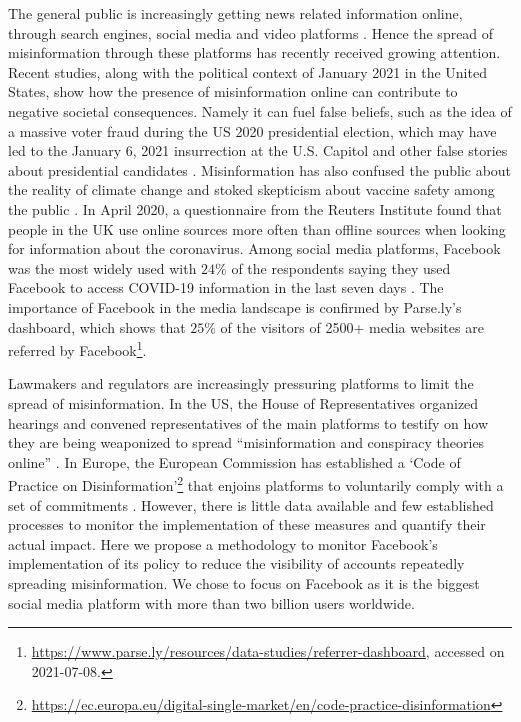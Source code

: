\documentclass[11pt,a4paper]{article}
\begin{document}
The general public is increasingly getting news related information online, through search engines, social media and video platforms \citep{mitchell2016modern}.
Hence the spread of misinformation through these platforms has recently received growing attention.
Recent studies, along with the political context of January 2021 in the United States, show how the presence of misinformation online can contribute to negative societal consequences.
Namely it can fuel false beliefs, such as the idea of a massive voter fraud during the US 2020 presidential election, which may have led to the January 6, 2021 insurrection at the U.S. Capitol \citep{benkler2020mail} and other false stories about presidential candidates \citep{allcott2017social}. 
Misinformation has also confused the public about the reality of climate change \citep{brulle30years, porter2019can} and stoked skepticism about vaccine safety among the public \citep{featherstone2020feeling, lahouati2020spread}. 
In April 2020, a questionnaire from the Reuters Institute found that people in the UK use online sources more often than offline sources when looking for information about the coronavirus. 
Among social media platforms, Facebook was the most widely used with $24\%$ of the respondents saying they used Facebook to access COVID-19 information in the last seven days \citep{fletcher2020information}.
The importance of Facebook in the media landscape is confirmed by Parse.ly’s dashboard, which shows that $25\%$ of the visitors of 2500+ media websites are referred by Facebook\footnote{\href{https://www.parse.ly/resources/data-studies/referrer-dashboard}{https://www.parse.ly/resources/data-studies/referrer-dashboard}, accessed on 2021-07-08.}.

Lawmakers and regulators are increasingly pressuring platforms to limit the spread of misinformation. 
In the US, the House of Representatives organized hearings and convened representatives of the main platforms to testify on how they are being weaponized to spread ``misinformation and conspiracy theories online'' \citep{donovan2020}. 
In Europe, the European Commission has established a `Code of Practice on Disinformation'\footnote{\href{https://ec.europa.eu/digital-single-market/en/code-practice-disinformation}{https://ec.europa.eu/digital-single-market/en/code-practice-disinformation}} that enjoins platforms to voluntarily comply with a set of commitments \citep{heldt2019let}. 
However, there is little data available and few established processes to monitor the implementation of these measures and quantify their actual impact. 
Here we propose a methodology to monitor Facebook’s implementation of its policy to reduce the visibility of accounts repeatedly spreading misinformation. 
We chose to focus on Facebook as it is the biggest social media platform with more than two billion users worldwide.
\end{document}

